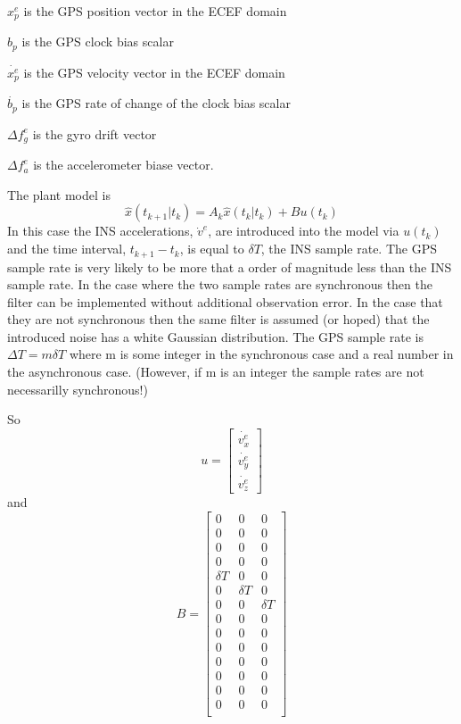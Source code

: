\documentclass[a4paper]{report}
\numberwithin{equation}{chapter}
\begin{document}
$x^e_p$ is the GPS position vector in the ECEF domain

$b_p$ is the GPS clock bias scalar

$\dot{x^e_p}$ is the GPS velocity vector in the ECEF domain

$\dot{b_p}$ is the GPS rate of change of the clock bias scalar

$\Delta f^e_g$ is the gyro drift vector

$\Delta f^e_a$ is the accelerometer biase vector.

\bigskip

The plant model is
\begin{equation}
\hat{x} \left( t_{k + 1} | t_k \right) = A_k \hat{x} \left( t_k | t_k \right) + B u \left( t_k \right)
\label{eqn:PlantModel}
\end{equation}
In this case the INS accelerations, $\dot{v}^e$, are introduced into the model via $u \left( t_k \right)$ and the time interval, $t_{k + 1} - t_k$, is equal to $\delta T$, the INS sample rate. The GPS sample rate is very likely to be more that a order of magnitude less than the INS sample rate. In the case where the two sample rates are synchronous then the filter can be implemented without additional observation error. In the case that they are not synchronous then the same filter is assumed (or hoped) that the introduced noise has a white Gaussian distribution. The GPS sample rate is $\Delta T = m \delta T$ where m is some integer in the synchronous case and a real number in the asynchronous case. (However, if m is an integer the sample rates are not necessarilly synchronous!)

\bigskip

So
\begin{equation}
u =
\begin{bmatrix}
\dot{v^e_x}\\
\dot{v^e_y}\\
\dot{v^e_z}
\end{bmatrix}
\end{equation}
and
\begin{equation}
B =
\begin{bmatrix}
0 & 0 & 0\\
0 & 0 & 0\\
0 & 0 & 0\\
0 & 0 & 0\\
\delta T & 0 & 0\\
0 & \delta T & 0\\
0 & 0 & \delta T\\
0 & 0 & 0\\
0 & 0 & 0\\
0 & 0 & 0\\
0 & 0 & 0\\
0 & 0 & 0\\
0 & 0 & 0\\
0 & 0 & 0\\
\end{bmatrix}
\end{equation}
\end{document}
